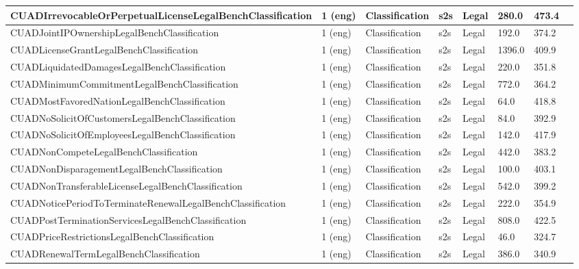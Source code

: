 \begin{longtable}{L{5.0cm}|L{1.5cm}L{1.4cm}L{1.4cm}L{1.4cm}L{1.4cm}L{1.0cm}L{1.0cm}}
 \hline 
CUADIrrevocableOrPerpetualLicenseLegalBenchClassification \cite{guha2023legalbench} & 1 (eng) & Classification & s2s & Legal & 280.0 & 473.4 \\
 \hline 
CUADJointIPOwnershipLegalBenchClassification \cite{guha2023legalbench} & 1 (eng) & Classification & s2s & Legal & 192.0 & 374.2 \\
 \hline 
CUADLicenseGrantLegalBenchClassification \cite{guha2023legalbench} & 1 (eng) & Classification & s2s & Legal & 1396.0 & 409.9 \\
 \hline 
CUADLiquidatedDamagesLegalBenchClassification \cite{guha2023legalbench} & 1 (eng) & Classification & s2s & Legal & 220.0 & 351.8 \\
 \hline 
CUADMinimumCommitmentLegalBenchClassification \cite{guha2023legalbench} & 1 (eng) & Classification & s2s & Legal & 772.0 & 364.2 \\
 \hline 
CUADMostFavoredNationLegalBenchClassification \cite{guha2023legalbench} & 1 (eng) & Classification & s2s & Legal & 64.0 & 418.8 \\
 \hline 
CUADNoSolicitOfCustomersLegalBenchClassification \cite{guha2023legalbench} & 1 (eng) & Classification & s2s & Legal & 84.0 & 392.9 \\
 \hline 
CUADNoSolicitOfEmployeesLegalBenchClassification \cite{guha2023legalbench} & 1 (eng) & Classification & s2s & Legal & 142.0 & 417.9 \\
 \hline 
CUADNonCompeteLegalBenchClassification \cite{guha2023legalbench} & 1 (eng) & Classification & s2s & Legal & 442.0 & 383.2 \\
 \hline 
CUADNonDisparagementLegalBenchClassification \cite{guha2023legalbench} & 1 (eng) & Classification & s2s & Legal & 100.0 & 403.1 \\
 \hline 
CUADNonTransferableLicenseLegalBenchClassification \cite{guha2023legalbench} & 1 (eng) & Classification & s2s & Legal & 542.0 & 399.2 \\
 \hline 
CUADNoticePeriodToTerminateRenewalLegalBenchClassification \cite{guha2023legalbench} & 1 (eng) & Classification & s2s & Legal & 222.0 & 354.9 \\
 \hline 
CUADPostTerminationServicesLegalBenchClassification \cite{guha2023legalbench} & 1 (eng) & Classification & s2s & Legal & 808.0 & 422.5 \\
 \hline 
CUADPriceRestrictionsLegalBenchClassification \cite{guha2023legalbench} & 1 (eng) & Classification & s2s & Legal & 46.0 & 324.7 \\
 \hline 
CUADRenewalTermLegalBenchClassification \cite{guha2023legalbench} & 1 (eng) & Classification & s2s & Legal & 386.0 & 340.9 \\

\end{longtable}
